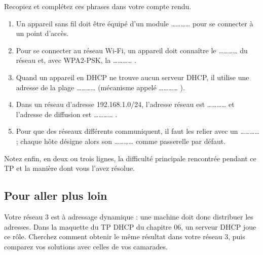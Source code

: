 \documentclass[
  french,
  10pt,
  a4paper,
]{scrartcl}
\providecommand{\tightlist}{%
  \setlength{\itemsep}{0pt}\setlength{\parskip}{0pt}}
\begin{document}
\begin{tcolorbox}[enhanced jigsaw, arc=.35mm, bottomrule=.15mm, bottomtitle=1mm, breakable, colback=white, colbacktitle=quarto-callout-important-color!10!white, colframe=quarto-callout-important-color-frame, coltitle=black, left=2mm, leftrule=.75mm, opacityback=0, opacitybacktitle=0.6, rightrule=.15mm, title=\textcolor{quarto-callout-important-color}{\faExclamation}\hspace{0.5em}{Synthèse à compléter}, titlerule=0mm, toprule=.15mm, toptitle=1mm]

Recopiez et complétez ces phrases dans votre compte rendu.

\begin{enumerate}
\def\labelenumi{\arabic{enumi}.}
\tightlist
\item
  Un appareil sans fil doit être équipé d'un module
  \ldots\ldots\ldots\ldots{} pour se connecter à un point d'accès.
\item
  Pour se connecter au réseau Wi-Fi, un appareil doit connaître le
  \ldots\ldots\ldots\ldots{} du réseau et, avec WPA2-PSK, la
  \ldots\ldots\ldots\ldots{} .
\item
  Quand un appareil en DHCP ne trouve aucun serveur DHCP, il utilise une
  adresse de la plage \ldots\ldots\ldots\ldots{} (mécanisme appelé
  \ldots\ldots\ldots\ldots{} ).
\item
  Dans un réseau d'adresse 192.168.1.0/24, l'adresse réseau est
  \ldots\ldots\ldots\ldots{} et l'adresse de diffusion est
  \ldots\ldots\ldots\ldots{} .
\item
  Pour que des réseaux différents communiquent, il faut les relier avec
  un \ldots\ldots\ldots\ldots{} ; chaque hôte désigne alors son
  \ldots\ldots\ldots\ldots{} comme passerelle par défaut.
\end{enumerate}

\end{tcolorbox}

Notez enfin, en deux ou trois lignes, la difficulté principale
rencontrée pendant ce TP et la manière dont vous l'avez résolue.

\subsection{Pour aller plus loin}\label{pour-aller-plus-loin}

Votre réseau 3 est à adressage dynamique : une machine doit donc
distribuer les adresses. Dans la maquette du TP DHCP du chapitre 06, un
serveur DHCP joue ce rôle. Cherchez comment obtenir le même résultat
dans votre réseau 3, puis comparez vos solutions avec celles de vos
camarades.
\end{document}
